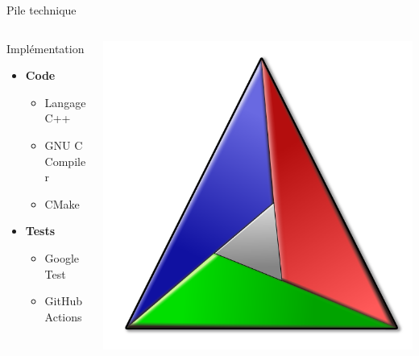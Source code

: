 \documentclass[french, 12pt]{beamer}
\begin{document}
\begin{frame}{Pile technique}
\begin{columns}
    \begin{column}{0.5\textwidth}
        Implémentation
        \begin{itemize}
            \item \textbf{Code}
            \begin{itemize}
                \item Langage C++
                \item GNU C Compiler
                \item CMake
            \end{itemize}
            \item \textbf{Tests}
            \begin{itemize}
                \item Google Test
                \item GitHub Actions
            \end{itemize}
        \end{itemize}
    \end{column}
    \begin{column}{0.5\textwidth}
        \begin{center}
            
            

            \includegraphics[scale=0.1]{./images/cmake-logo.png}
        \end{center}
    \end{column}
\end{columns}
\end{frame}
\end{document}
